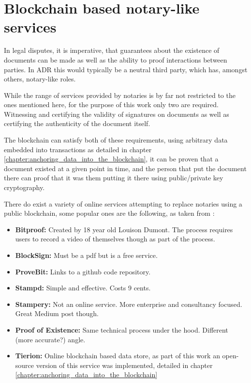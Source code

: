 \documentclass[12pt,msc,a4paper,oneside]{ucl_thesis}
\begin{document}
\section{Blockchain based notary-like services}
In legal disputes, it is imperative, that guarantees about the existence of documents can be made as well as the ability to proof interactions between parties. In ADR this would typically be a neutral third party, which has, amongst others, notary-like roles. 

While the range of services provided by notaries is by far not restricted to the ones mentioned here, for the purpose of this work only two are required. Witnessing and certifying the validity of signatures on documents as well as certifying the authenticity of the document itself. \cite{notary:does_blockchain_notary_work}

The blockchain can satisfy both of these requirements, using arbitrary data embedded into transactions as detailed in chapter \ref{chapter:anchoring_data_into_the_blockchain}, it can be proven that a document existed at a given point in time, and the person that put the document there can proof that it was them putting it there using public/private key cryptography. 

There do exist a variety of online services attempting to replace notaries using a public blockchain, some popular ones are the following, as taken from \cite{notary:does_blockchain_notary_work}:

\begin{itemize}
    \item{\textbf{Bitproof:}} Created by 18 year old Louison Dumont. The process requires users to record a video of themselves though as part of the process.
    \item{\textbf{BlockSign:}} Must be a pdf but is a free service.
    \item{\textbf{ProveBit:}} Links to a github code repository.
    \item{\textbf{Stampd:}} Simple and effective. Costs 9 cents.
    \item{\textbf{Stampery:}} Not an online service. More enterprise and consultancy focused. Great Medium post though.
    \item{\textbf{Proof of Existence:}} Same technical process under the hood. Different (more accurate?) angle.
    \item{\textbf{Tierion:}} Online blockchain based data store, as part of this work an open-source version of this service was implemented, detailed in chapter \ref{chapter:anchoring_data_into_the_blockchain}
\end{itemize}
\end{document}
